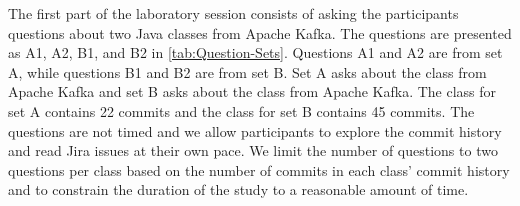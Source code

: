 The first part of the laboratory session consists of 
asking the participants questions about two Java classes from Apache Kafka.
The questions are presented as A1, A2, B1, and B2 in \autoref{tab:Question-Sets}.
Questions A1 and A2 are from set A, while questions B1 and B2 are from set B.
Set A asks about the  class from Apache Kafka and 
set B asks about the  class from Apache Kafka.
The  class for set A contains 22 commits and the  class for set B contains 45 commits.
The questions are not timed and we allow participants to explore the commit history and read Jira issues at their own pace.
We limit the number of questions to two questions per class based on the number of commits in each class' commit history and 
to constrain the duration of the study to a reasonable amount of time.

